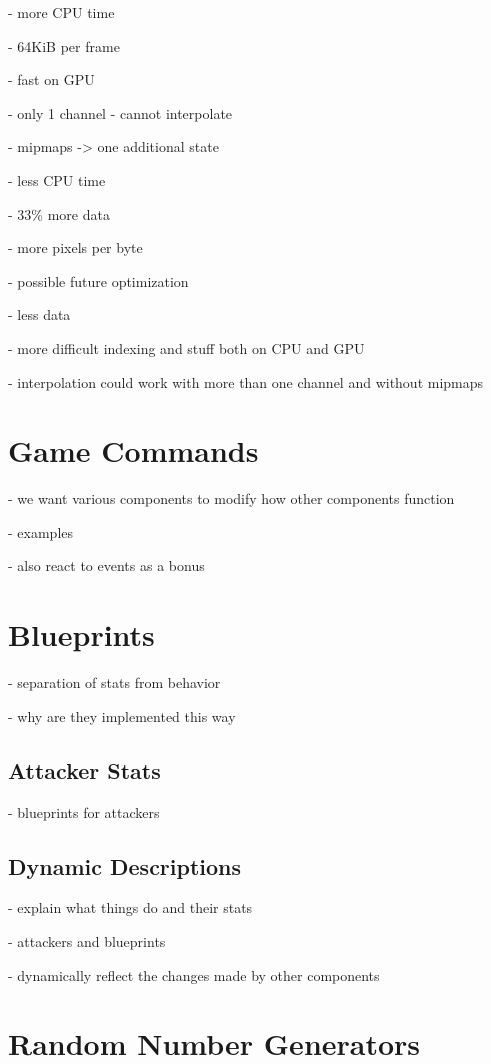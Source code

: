 - more CPU time

- 64KiB per frame

- fast on GPU

- only 1 channel - cannot interpolate

- mipmaps -> one additional state

- less CPU time

- 33\% more data

- more pixels per byte

- possible future optimization

- less data

- more difficult indexing and stuff both on CPU and GPU

- interpolation could work with more than one channel and without mipmaps

\section{Game Commands}

- we want various components to modify how other components function

- examples

- also react to events as a bonus

\section{Blueprints}

- separation of stats from behavior

- why are they implemented this way

\subsection{Attacker Stats}

- blueprints for attackers

\subsection{Dynamic Descriptions}

- explain what things do and their stats

- attackers and blueprints

- dynamically reflect the changes made by other components

\section{Random Number Generators}\label{sec:analysis-rng}


